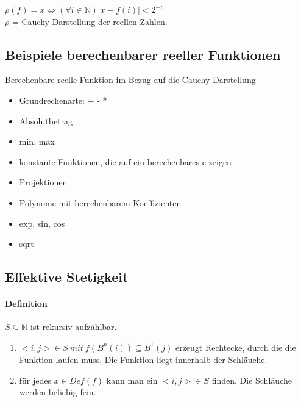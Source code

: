 \documentclass[ngerman]{scrartcl}
\begin{document}
\begin{center}
  $ \rho(f) = x \Leftrightarrow (\forall i \in \mathbb{N})|x-f(i)|< 2^{-i}$ \\
  $ \rho $ = Cauchy-Darstellung der reellen Zahlen.
\end{center}

\subsection{Beispiele berechenbarer reeller Funktionen}

Berechenbare reelle Funktion im Bezug auf die Cauchy-Darstellung
\begin{itemize}
  \item Grundrechenarte: + - *
  \item Absolutbetrag
  \item min, max
  \item konstante Funktionen, die auf ein berechenbares c zeigen
  \item Projektionen
  \item Polynome mit berechenbarem Koeffizienten
  \item exp, sin, cos
  \item sqrt
\end{itemize}


\subsection{Effektive Stetigkeit}

\paragraph{Definition}
$ S \subseteq \mathbb{N} $ ist rekursiv aufzählbar.
\begin{enumerate}
  \item $ <i,j> \in S\ mit\ f(B^n(i))\subseteq B^1(j) $ erzeugt Rechtecke, durch die die Funktion laufen muss. Die Funktion liegt innerhalb der Schläuche.
  \item für jedes $ x\in Def(f) $ kann man ein $ <i,j> \in S $ finden. Die Schläuche werden beliebig fein.
\end{enumerate}
\end{document}
